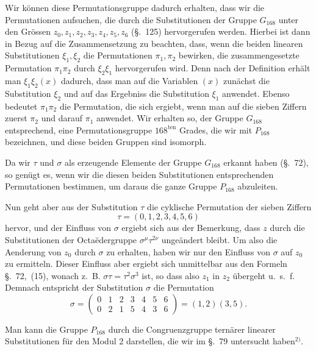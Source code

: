 \documentclass[12pt,a4paper]{article}
\begin{document}
Wir k\"onnen diese Permutationsgruppe dadurch erhalten, dass wir die Permutationen aufsuchen, die durch die Substitutionen der Gruppe $G_{168}$ unter den Gr\"ossen $z_0, z_1, z_2, z_3, z_4, z_5, z_6$ (\S.~125) hervorgerufen werden. Hierbei ist dann in Bezug auf die Zusammensetzung zu beachten, dass, wenn die beiden linearen Substitutionen $\xi_1, \xi_2$ die Permutationen $\pi_1, \pi_2$ bewirken, die zusammengesetzte Permutation $\pi_1 \pi_2$ durch $\xi_2 \xi_1$ hervorgerufen wird. Denn nach der Definition erh\"alt man $\xi_1 \xi_2 (x)$ dadurch, dass man auf die Variablen $(x)$ zun\"achst die Substitution $\xi_2$ und auf das Ergebniss die Substitution $\xi_1$ anwendet. Ebenso bedeutet $\pi_1 \pi_2$ die Permutation, die sich ergiebt, wenn man auf die sieben Ziffern zuerst $\pi_2$ und darauf $\pi_1$ anwendet. Wir erhalten so, der Gruppe $G_{168}$ entsprechend, eine Permutationsgruppe $168^{\text{ten}}$ Grades, die wir mit $P_{168}$ bezeichnen, und diese beiden Gruppen sind isomorph.

Da wir $\tau$ und $\sigma$ als erzeugende Elemente der Gruppe $G_{168}$ erkannt haben (\S.~72), so gen\"ugt es, wenn wir die diesen beiden Substitutionen entsprechenden Permutationen bestimmen, um daraus die ganze Gruppe $P_{168}$ abzuleiten.

Nun geht aber aus der Substitution $\tau$ die cyklische Permutation der sieben Ziffern
\begin{equation}
\label{eq:cyklisch} \tau = (0, 1, 2, 3, 4, 5, 6)
\end{equation}
hervor, und der Einfluss von $\sigma$ ergiebt sich aus der Bemerkung, dass $z$ durch die Substitutionen der Octa\"edergruppe $\sigma^{\mu}\tau^{2\nu}$ unge\"andert bleibt. Um also die Aenderung von $z_0$ durch $\sigma$ zu erhalten, haben wir nur den Einfluss von $\sigma$ auf $z_0$ zu ermitteln. Dieser Einfluss aber ergiebt sich unmittelbar aus den Formeln \S.~72,~(15), wonach z.~B. $\sigma\tau = \tau^2\sigma^3$ ist, so dass also $z_1$ in $z_2$ \"ubergeht u.~s.~f. Demnach entspricht der Substitution $\sigma$ die Permutation
\begin{equation}
\label{eq:sigmaperm} \sigma = \begin{pmatrix} 0 & 1 & 2 & 3 & 4 & 5 & 6 \\ 0 & 2 & 1 & 5 & 4 & 3 & 6 \end{pmatrix} = (1, 2)(3, 5).
\end{equation}

Man kann die Gruppe $P_{168}$ durch die Congruenzgruppe tern\"arer linearer Substitutionen f\"ur den Modul 2 darstellen, die wir im \S.~79 untersucht haben$^{2)}$.
\end{document}
